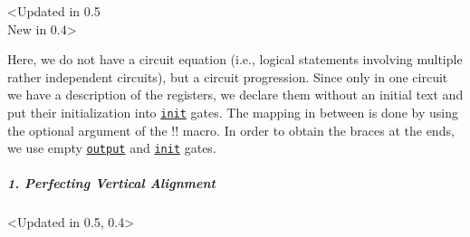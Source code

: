 \documentclass{scrartcl}
\makeatletter
\newenvironment{codeexample*}{%
   \VerbatimEnvironment%
   \let\FVB@VerbatimOut\minted@FVB@VerbatimOut
   \let\FVE@VerbatimOut\minted@FVE@VerbatimOut
   \minted@configlang{tex}%
   \minted@fvset
   \begin{VerbatimOut}[codes={\catcode`\^^I=12},firstline,lastline]{\minted@jobname.pyg}%
}{
   \end{VerbatimOut}%
   \minted@langlinenoson%
   \begin{adjustbox}{center}
       \minted@jobname.pyg %
   \end{adjustbox}\nopagebreak
   \minted@pygmentize{\minted@lang}%
   \minted@langlinenosoff%
   \par%
}
\def\gate#1{\hyperref[gate:#1]{\texttt{#1}}}
\makeatother
\begin{document}
               \clearpage
               \begin{example}<Updated in 0.5\\New in 0.4>
                  \begin{codeexample*}
\begin{yquantgroup}
\end{yquantgroup}
                  \end{codeexample*}
                  Here, we do not have a circuit equation (i.e., logical statements involving multiple rather independent circuits), but a circuit progression.
                  Since only in one circuit we have a description of the registers, we declare them without an initial text and put their initialization into \gate{init} gates.
                  The mapping in between is done by using the optional argument of the \tex!\equals! macro.
                  In order to obtain the braces at the ends, we use empty \gate{output} and \gate{init} gates.
               \end{example}

               \clearpage
               \subparagraph{1. Perfecting Vertical Alignment}\leavevmode
                  \begin{example}<Updated in 0.5, 0.4>
                     \begin{codeexample*}
\begin{yquantgroup}
   \equals
\end{yquantgroup}
                     \end{codeexample*}
                  \end{example}
\end{document}
